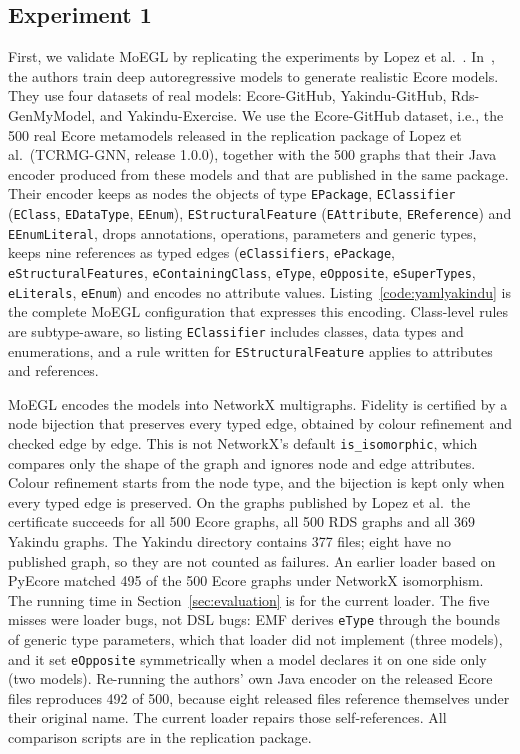 \documentclass[journal,article,submit,moreauthors,technologies]{Definitions/mdpi}
\newcommand{\rev}[1]{#1}
\begin{document}
\subsection{Experiment 1}
First, we validate MoEGL by replicating the experiments by Lopez et al.~\cite{lopez2022generating}. In~\cite{lopez2022generating}, the authors train deep autoregressive models to generate realistic Ecore models. They use four datasets of real models: Ecore-GitHub, Yakindu-GitHub, Rds-GenMyModel, and Yakindu-Exercise.
\rev{We use the Ecore-GitHub dataset, i.e., the 500 real Ecore metamodels released in the replication package of Lopez et al.\ (TCRMG-GNN, release 1.0.0), together with the 500 graphs that their Java encoder produced from these models and that are published in the same package. Their encoder keeps as nodes the objects of type \texttt{EPackage}, \texttt{EClassifier} (\texttt{EClass}, \texttt{EDataType}, \texttt{EEnum}), \texttt{EStructuralFeature} (\texttt{EAttribute}, \texttt{EReference}) and \texttt{EEnumLiteral}, drops annotations, operations, parameters and generic types, keeps nine references as typed edges (\texttt{eClassifiers}, \texttt{ePackage}, \texttt{eStructuralFeatures}, \texttt{eContainingClass}, \texttt{eType}, \texttt{eOpposite}, \texttt{eSuperTypes}, \texttt{eLiterals}, \texttt{eEnum}) and encodes no attribute values. Listing~\ref{code:yamlyakindu} is the complete MoEGL configuration that expresses this encoding. Class-level rules are subtype-aware, so listing \texttt{EClassifier} includes classes, data types and enumerations, and a rule written for \texttt{EStructuralFeature} applies to attributes and references.}

\rev{MoEGL encodes the models into NetworkX multigraphs. Fidelity is certified by a node bijection that preserves every typed edge, obtained by colour refinement and checked edge by edge. This is not NetworkX's default \texttt{is\_isomorphic}, which compares only the shape of the graph and ignores node and edge attributes. Colour refinement starts from the node type, and the bijection is kept only when every typed edge is preserved. On the graphs published by Lopez et al.\ the certificate succeeds for all 500 Ecore graphs, all 500 RDS graphs and all 369 Yakindu graphs. The Yakindu directory contains 377 files; eight have no published graph, so they are not counted as failures. An earlier loader based on PyEcore matched 495 of the 500 Ecore graphs under NetworkX isomorphism. The running time in Section~\ref{sec:evaluation} is for the current loader. The five misses were loader bugs, not DSL bugs: EMF derives \texttt{eType} through the bounds of generic type parameters, which that loader did not implement (three models), and it set \texttt{eOpposite} symmetrically when a model declares it on one side only (two models). Re-running the authors' own Java encoder on the released Ecore files reproduces 492 of 500, because eight released files reference themselves under their original name. The current loader repairs those self-references. All comparison scripts are in the replication package.}
\end{document}
